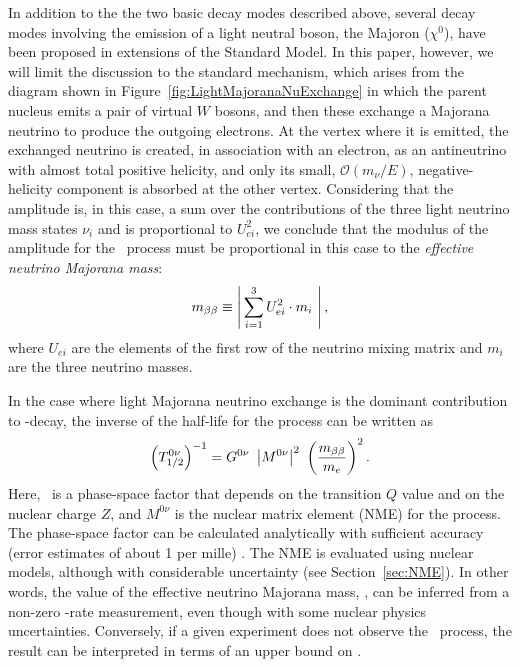\documentclass{PoS}
\begin{document}
In addition to the the two basic decay modes described above, several decay modes involving the emission of a light neutral boson, the Majoron ($\chi^{0}$), have been proposed in extensions of the Standard Model. In this paper, however, we will limit the discussion to the standard mechanism, which arises from the diagram shown in Figure~\ref{fig:LightMajoranaNuExchange} in which the parent nucleus emits a pair of virtual $W$ bosons, and then these exchange a Majorana neutrino to produce the outgoing electrons. At the vertex where it is emitted, the exchanged neutrino is created, in association with an electron, as an antineutrino with almost total positive helicity, and only its small, $\mathcal{O}(m_{\nu}/E)$, negative-helicity component is absorbed at the other vertex. Considering that the amplitude is, in this case, a sum over the contributions of the three light neutrino mass states $\nu_i$ and is proportional to $U_{ei}^2$, we conclude that the modulus of the amplitude for the \bbonu\ process must be proportional in this case to the \emph{effective neutrino Majorana mass}:
\begin{equation}
\mbb \equiv \left|\, \sum_{i=1}^3 U_{ei}^2\cdot m_i\ \right|, \label{eq:mbb}
\end{equation}
where $U_{ei}$ are the elements of the first row of the neutrino mixing matrix and $m_{i}$ are the three neutrino masses.

In the case where light Majorana neutrino exchange is the dominant contribution to \bbonu-decay, the inverse of the half-life for the process can be written as
\begin{equation}
\left(T^{0\nu}_{1/2}\right)^{-1} = G^{0\nu}\ \left|M^{0\nu}\right|^2\ \left(\frac{\mbb}{m_{e}}\right)^2.
\label{eq:Tonu}
\end{equation}
Here, \Gonu\ is a phase-space factor that depends on the transition $Q$ value and on the nuclear charge $Z$, and $M^{0\nu}$ is the nuclear matrix element (NME) for the process. The phase-space factor can be calculated analytically with sufficient accuracy (error estimates of about 1 per mille) \cite{Kotila:2012zza}. The NME is evaluated using nuclear models, although with considerable uncertainty (see Section~\ref{sec:NME}). In other words, the value of the effective neutrino Majorana mass, \mbb, can be inferred from a non-zero \bbonu-rate measurement, even though with some nuclear physics uncertainties. Conversely, if a given experiment does not observe the \bbonu\ process, the result can be interpreted in terms of an upper bound on \mbb.  
\end{document}
